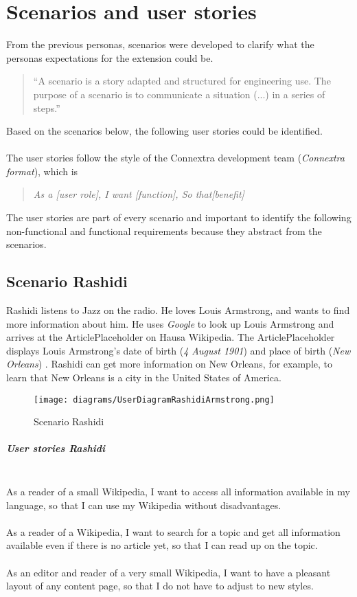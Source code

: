 \chapter{Scenarios and user stories}

From the previous personas, scenarios were developed to clarify what the personas expectations for the extension could be.
\begin{quote}
``A scenario is a story adapted and structured for engineering use. The purpose of a scenario is to communicate a situation (...) in a series of steps.'' \citep[98]{scenario} 
\end{quote}
Based on the scenarios below, the following user stories could be identified. \\
\\
The user stories follow the style of the Connextra development team (\textit{Connextra format}), which is
\begin{quote}
\textit{As a [user role], \newline I want [function], \newline So that[benefit]}
\end{quote} 
\citep{connextrastory,userstory}
The user stories are part of every scenario and important to identify the following non-functional and functional requirements because they abstract from the scenarios. 

\section{Scenario Rashidi}
Rashidi listens to Jazz on the radio. He loves Louis Armstrong, and wants to find more information about him. He uses \textit{Google} to look up Louis Armstrong and arrives at the ArticlePlaceholder on Hausa Wikipedia. The ArticlePlaceholder displays Louis Armstrong's date of birth (\textit{4 August 1901}) and place of birth (\textit{New Orleans}) \citep{wd:03}. Rashidi can get more information on New Orleans, for example, to learn that New Orleans is a city in the United States of America. 
\begin{figure}[H]
	\centering
	\texttt{[image: diagrams/UserDiagramRashidiArmstrong.png]}
	\caption{Scenario Rashidi}
	\label{fig:ScenarioRashidi}
\end{figure}

\paragraph{User stories Rashidi} ~\\
As a reader of a small Wikipedia, I want to access all information available in my language, so that I can use my Wikipedia without disadvantages. \\
\\
As a reader of a Wikipedia, I want to search for a topic and get all information available even if there is no article yet, so that I can read up on the topic. \\
\\
As an editor and reader of a very small Wikipedia, I want to have a pleasant layout of any content page, so that I do not have to adjust to new styles.


